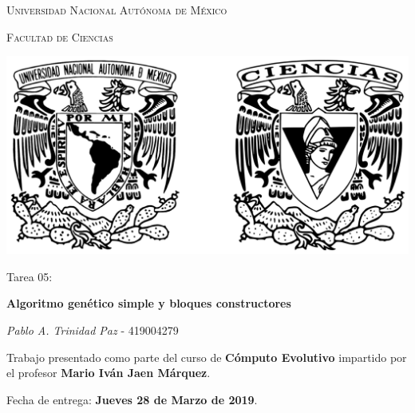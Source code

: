 \documentclass[10pt,letterpaper]{article}
\begin{document}
\begin{titlepage}
    \centering

    {\scshape\LARGE Universidad Nacional Autónoma de México \par}

    \vspace{1cm}
    {\scshape\Large Facultad de Ciencias\par}
    \vspace{1.5cm}

    \begin{center}
        \includegraphics[scale=.1]{../../assets/img/logo.png}
    \end{center}

    \vspace{.8 cm}

    {\LARGE Tarea 05: \par}
    {\huge\bfseries Algoritmo genético simple y bloques constructores\par}

    \vspace{0.5cm}
    \large{\itshape{Pablo A. Trinidad Paz}} \small{ - 419004279}

    \vfill

    Trabajo presentado como parte del curso de
    \textbf{Cómputo Evolutivo}
    impartido por el profesor \textbf{Mario Iván Jaen Márquez}. \par
    \vspace{0.5cm}
    Fecha de entrega: \textbf{Jueves 28 de Marzo de 2019}.
\end{titlepage}
\end{document}
